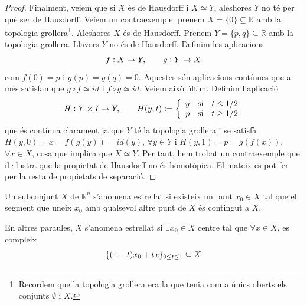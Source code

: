 \documentclass[../main.tex]{subfiles}
\begin{document}
\begin{proof}
Finalment, veiem que si $X$ és de Hausdorff i $X\simeq Y$, aleshores $Y$ no té per què ser de Hausdorff. Veiem un  contraexemple: prenem $X = \{0\}\subseteq \mathbb{R}$ amb la topologia grollera\footnote{Recordem que la topologia grollera era la que tenia com a únics oberts els conjunts $\emptyset$ i $X$.}. Aleshores $X$ és de Hausdorff. Prenem $Y = \{p,q\}\subseteq\mathbb{R}$ amb la topologia grollera. Llavors $Y$ no és de Hausdorff. Definim les aplicacions
\begin{equation}
    \notag
    f:X\rightarrow Y,\qquad g:Y\rightarrow X
\end{equation}
com $f(0) = p$ i $g(p) = g(q) = 0$. Aquestes són aplicacions contínues que a més satisfan que $g\circ f\simeq id$ i $f\circ g\simeq id$. Veiem això últim. Definim l'aplicació
\begin{equation}
    \notag
    H:Y\times I\rightarrow Y,\qquad H(y,t) := \left\{
    \begin{array}{rcl}
        y & \text{si} & t\leq 1/2 \\
        p & \text{si} & t\geq 1/2
    \end{array}
    \right.
\end{equation}
que és contínua clarament ja que $Y$ té la topologia grollera i se satisfà $H(y,0) = x = f(g(y)) = id(y)$, $\forall y\in Y$ i $H(y,1) = p = g(f(x))$, $\forall x\in X$, cosa que implica que $X\simeq Y$. Per tant, hem trobat un contraexemple que il·lustra que la propietat de Hausdorff no és homotòpica. El mateix es pot fer per la resta de propietats de separació.
\end{proof}

\begin{defi}
[Estrellat]\label{def:estrellat} Un subconjunt $X$ de $\mathbb{R}^n$ s'anomena estrellat si existeix un punt $x_0\in X$ tal que el segment que uneix $x_0$ amb qualsevol altre punt de $X$ és contingut a $X$.
\end{defi}

En altres paraules, $X$ s'anomena estrellat si $\exists x_0\in X$ centre tal que $\forall x\in X$, es compleix
\begin{equation}
    \notag
    \{(1-t)x_0 +tx\}_{0\leq t\leq 1}\subseteq X
\end{equation}
\end{document}
